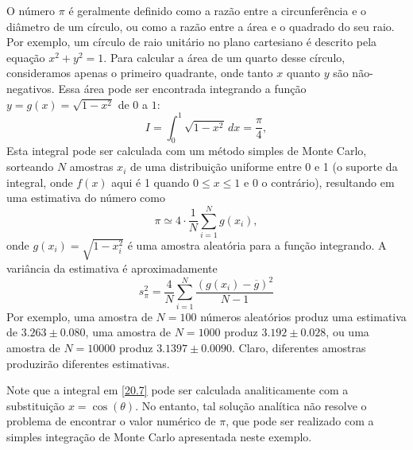 \begin{exemplo}{}{}
O número $\pi$ é geralmente definido como a razão entre a circunferência e o diâmetro de um círculo, ou como a razão entre a área e o quadrado do seu raio. Por exemplo, um círculo de raio unitário no plano cartesiano é descrito pela equação $x^2 + y^2 = 1$. Para calcular a área de um quarto desse círculo, consideramos apenas o primeiro quadrante, onde tanto $x$ quanto $y$ são não-negativos. Essa área pode ser encontrada integrando a função $y = g(x) = \sqrt{1 - x^2}$ de $0$ a $1$:
\begin{equation}\label{20.7}
I = \int_0^1 \sqrt{1 - x^2}\, dx = \dfrac{\pi}{4},
\end{equation}
Esta integral pode ser calculada com um método simples de Monte Carlo, sorteando $N$ amostras $x_i$ de uma distribuição uniforme entre 0 e 1 (o suporte da integral, onde $f(x)$ aqui é 1 quando $0 \leq x \leq 1$ e $0$ o contrário), resultando em uma estimativa do número como
\begin{equation*}
\pi \simeq 4 \cdot \dfrac{1}{N} \sum_{i=1}^N  g(x_i),
\end{equation*}
onde $g(x_i) = \sqrt{1 - x_i^2}$ é uma amostra aleatória para a função integrando. A variância da estimativa é aproximadamente
\begin{equation*}
s_\pi^2 =  \dfrac{4}{N} \sum_{i=1}^N \dfrac{\left(g(x_i) - \overline{g}\right)^2}{N-1}
\end{equation*}
Por exemplo, uma amostra de $N = 100$ números aleatórios produz uma estimativa de $3.263 \pm 0.080$, uma amostra de $N = 1000$ produz $3.192 \pm 0.028$, ou uma amostra de $N = 10000$ produz $3.1397 \pm 0.0090$. Claro, diferentes amostras produzirão diferentes estimativas.

Note que a integral em \eqref{20.7} pode ser calculada analiticamente com a substituição $x = \cos(\theta)$. No entanto, tal solução analítica não resolve o problema de encontrar o valor numérico de $\pi$, que pode ser realizado com a simples integração de Monte Carlo apresentada neste exemplo.
\end{exemplo}